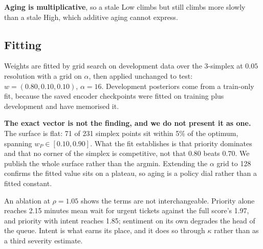 \textbf{Aging is multiplicative}, so a stale Low climbs but still climbs more
slowly than a stale High, which additive aging cannot express.

\subsection{Fitting}

Weights are fitted by grid search on development data over the 3-simplex at
$0.05$ resolution with a grid on $\alpha$, then applied unchanged to test:
$w = (0.80, 0.10, 0.10)$, $\alpha = 16$. Development posteriors come from a
train-only fit, because the saved encoder checkpoints were fitted on training
plus development and have memorised it.

\textbf{The exact vector is not the finding, and we do not present it as one.}
The surface is flat: 71 of 231 simplex points sit within 5\% of the optimum,
spanning $w_P \in [0.10, 0.90]$. What the fit establishes is that priority
dominates and that no corner of the simplex is competitive, not that $0.80$ beats
$0.70$. We publish the whole surface rather than the argmin. Extending the
$\alpha$ grid to 128 confirms the fitted value sits on a plateau, so aging is a
policy dial rather than a fitted constant.

An ablation at $\rho = 1.05$ shows the terms are not interchangeable. Priority
alone reaches 2.15 minutes mean wait for urgent tickets against the full score's
1.97, and priority with intent reaches 1.85; sentiment on its own degrades the
head of the queue. Intent is what earns its place, and it does so through
$\kappa$ rather than as a third severity estimate.
